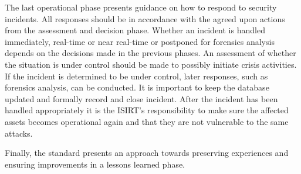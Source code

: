The last operational phase presents guidance on how to respond to security incidents. All responses should be in accordance with the agreed upon actions from the assessment and decision phase. Whether an incident is handled immediately, real-time or near real-time or postponed for forensics analysis depends on the decisions made in the previous phases. An assessment of whether the situation is under control should be made to possibly initiate crisis activities. If the incident is determined to be under control, later responses, such as forensics analysis, can be conducted. It is important to keep the database updated and formally record and close incident. After the incident has been handled appropriately it is the ISIRT's responsibility to make sure the affected assets becomes operational again and that they are not vulnerable to the same attacks. 


Finally, the standard presents an approach towards preserving experiences and ensuring improvements in a lessons learned phase. 



